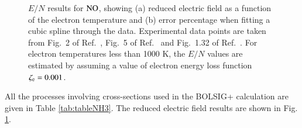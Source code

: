 \begin{figure}[!htbp]
\caption{$E/N$ results for $\rm NO$, showing (a) reduced electric field as a function of the electron temperature and (b) error percentage when fitting a cubic spline through the data. Experimental data points are taken from Fig.\ 2 of Ref.\ , Fig.\ 5 of Ref.\  and Fig.\ 1.32 of Ref.\ . For electron temperatures less than 1000 K, the $E/N$ values are estimated by assuming a value of electron energy loss function $\zeta_{\rm e} = 0.001$. }
\label{fig:electronimpact_3}
\end{figure}
%
All the processes involving cross-sections used in the BOLSIG+ calculation are given in Table \ref{tab:tableNH3}. The reduced electric field results are shown in Fig. \ref{fig:electronimpact_3}.
%
